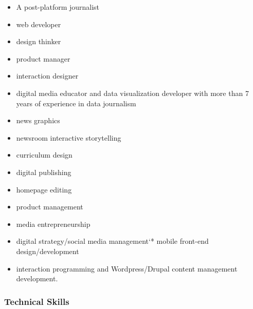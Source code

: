 \documentclass{article}
\begin{document}
\begin{itemize}[noitemsep,topsep=\mdcompacttopsep]%

\item{}A post-platform journalist%

\item{}web developer%

\item{}design thinker%

\item{}product manager%

\item{}interaction designer%

\item{}digital media educator and data visualization developer with more than 7 years of experience in data journalism%

\item{}news graphics%

\item{}newsroom interactive storytelling%

\item{}curriculum design%

\item{}digital publishing%

\item{}homepage editing%

\item{}product management%

\item{}media entrepreneurship%

\item{}digital strategy/social media management`* mobile front-end design/development%

\item{}interaction programming and Wordpress/Drupal content management development.%
\end{itemize}%

\subsubsection{Technical Skills}\label{sec-technical-skills}%
\end{document}
